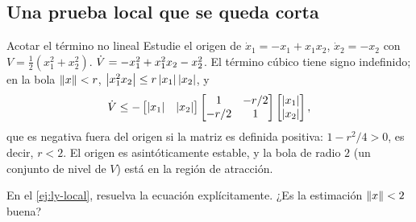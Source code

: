 \subsection{Una prueba local que se queda corta}

\begin{ejemplo}[label=ej:ly-local]{Acotar el término no lineal}
Estudie el origen de $\dot x_1=-x_1+x_1x_2$, $\dot x_2=-x_2$ con $V=\tfrac12(x_1^2+x_2^2)$.
\solucion $\dot V=-x_1^2+x_1^2x_2-x_2^2$. El término cúbico tiene signo indefinido; en la bola $\left\lVert x\right\rVert<r$, $\left\lvert x_1^2x_2\right\rvert\le r\left\lvert x_1\right\rvert\left\lvert x_2\right\rvert$, y
\[
  \dot V\le-\begin{bmatrix}\left\lvert x_1\right\rvert&\left\lvert x_2\right\rvert\end{bmatrix}\begin{bmatrix}1&-r/2\\-r/2&1\end{bmatrix}\begin{bmatrix}\left\lvert x_1\right\rvert\\\left\lvert x_2\right\rvert\end{bmatrix} ,
\]
que es negativa fuera del origen si la matriz es definida positiva: $1-r^2/4>0$, es decir, $r<2$. El origen es asintóticamente estable, y la bola de radio $2$ (un conjunto de nivel de $V$) está en la región de atracción.
\end{ejemplo}

\begin{pausa}
En el \cref{ej:ly-local}, resuelva la ecuación explícitamente. ¿Es la estimación $\left\lVert x\right\rVert<2$ buena?
\end{pausa}
